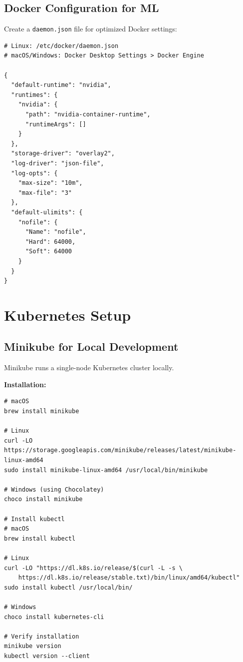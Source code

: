 \subsection{Docker Configuration for ML}

Create a \texttt{daemon.json} file for optimized Docker settings:

\begin{lstlisting}[style=shell]
# Linux: /etc/docker/daemon.json
# macOS/Windows: Docker Desktop Settings > Docker Engine

{
  "default-runtime": "nvidia",
  "runtimes": {
    "nvidia": {
      "path": "nvidia-container-runtime",
      "runtimeArgs": []
    }
  },
  "storage-driver": "overlay2",
  "log-driver": "json-file",
  "log-opts": {
    "max-size": "10m",
    "max-file": "3"
  },
  "default-ulimits": {
    "nofile": {
      "Name": "nofile",
      "Hard": 64000,
      "Soft": 64000
    }
  }
}
\end{lstlisting}

\section{Kubernetes Setup}

\subsection{Minikube for Local Development}

Minikube runs a single-node Kubernetes cluster locally.

\textbf{Installation:}

\begin{lstlisting}[style=shell]
# macOS
brew install minikube

# Linux
curl -LO https://storage.googleapis.com/minikube/releases/latest/minikube-linux-amd64
sudo install minikube-linux-amd64 /usr/local/bin/minikube

# Windows (using Chocolatey)
choco install minikube

# Install kubectl
# macOS
brew install kubectl

# Linux
curl -LO "https://dl.k8s.io/release/$(curl -L -s \
    https://dl.k8s.io/release/stable.txt)/bin/linux/amd64/kubectl"
sudo install kubectl /usr/local/bin/

# Windows
choco install kubernetes-cli

# Verify installation
minikube version
kubectl version --client
\end{lstlisting}

